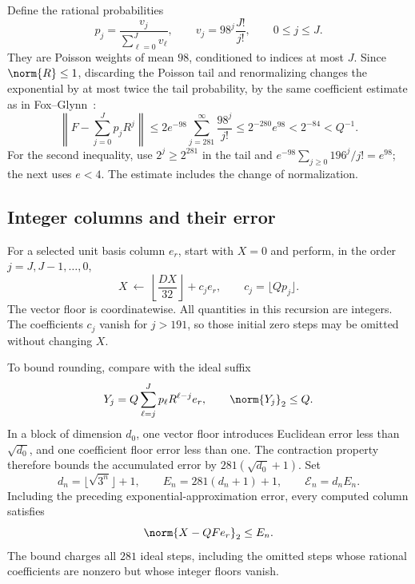 Define the rational probabilities
\begin{equation}\label{eq:thermal72-coefficients}
 p_j=\frac{v_j}{\sum_{\ell=0}^Jv_\ell},
 \qquad v_j=98^j\frac{J!}{j!},
 \qquad 0\le j\le J.
\end{equation}
They are Poisson weights of mean \(98\), conditioned to indices at most
\(J\). Since \(\norm{R}\le1\), discarding the Poisson tail and renormalizing
changes the exponential by at most twice the tail probability, by the
same coefficient estimate as in Fox--Glynn~\cite[Proposition~1]{FoxGlynn1988}:
\[
 \left\|F-\sum_{j=0}^Jp_jR^j\right\|
 \le 2e^{-98}\sum_{j=281}^{\infty}\frac{98^j}{j!}
 \le2^{-280}e^{98}<2^{-84}<Q^{-1}.
\]
For the second inequality, use \(2^j\ge2^{281}\) in the tail and
\(e^{-98}\sum_{j\ge0}196^j/j!=e^{98}\); the next uses \(e<4\).
The estimate includes the change of normalization.

\subsection{Integer columns and their error}

For a selected unit basis column \(e_r\), start with \(X=0\) and perform,
in the order \(j=J,J-1,\ldots,0\),
\begin{equation}\label{eq:thermal72-horner}
 X\ \longleftarrow\
 \left\lfloor\frac{DX}{32}\right\rfloor+c_je_r,
 \qquad c_j=\lfloor Qp_j\rfloor.
\end{equation}
The vector floor is coordinatewise. All quantities in this recursion are
integers. The coefficients \(c_j\) vanish for \(j>191\), so those initial
zero steps may be omitted without changing \(X\).

To bound rounding, compare with the ideal suffix
\[
 Y_j=Q\sum_{\ell=j}^Jp_\ell R^{\ell-j}e_r,\qquad \norm{Y_j}_2\le Q.
\]
In a block of dimension \(d_0\), one vector floor introduces Euclidean
error less than \(\sqrt{d_0}\), and one coefficient floor error less than
one. The contraction property therefore bounds the accumulated error
by \(281(\sqrt{d_0}+1)\). Set
\begin{equation}\label{eq:thermal72-errors}
 d_n=\lfloor\sqrt{3^n}\rfloor+1,\qquad
 E_n=281(d_n+1)+1,\qquad \mathcal E_n=d_nE_n.
\end{equation}
Including the preceding exponential-approximation error, every computed
column satisfies
\begin{equation}\label{eq:thermal72-column-error}
 \norm{X-QFe_r}_2\le E_n.
\end{equation}
The bound charges all \(281\) ideal steps, including the omitted steps
whose rational coefficients are nonzero but whose integer floors vanish.

